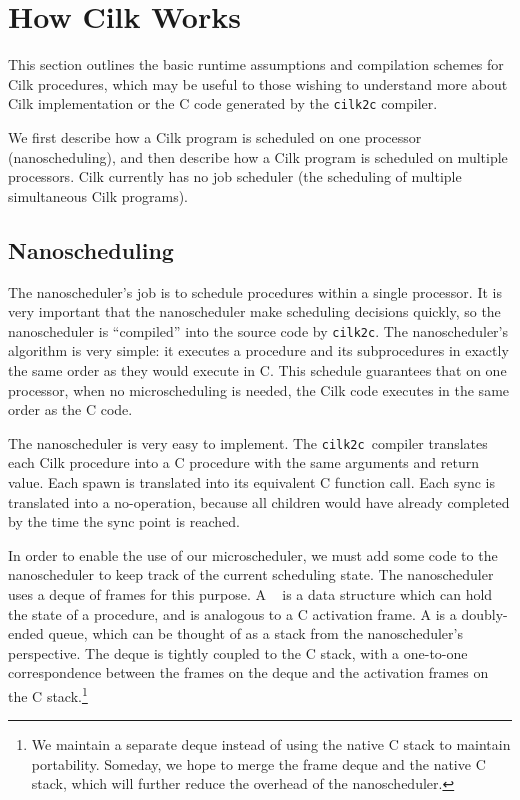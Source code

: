 \chapter{How Cilk Works}
\label{chap:impl-notes}

\newcommand{\cilktoc}{\texttt{cilk2c}}

This section outlines the basic runtime assumptions and compilation
schemes for Cilk procedures, which may be useful to those wishing to
understand more about Cilk implementation or the C code generated by
the \cilktoc{} compiler.

We first describe how a Cilk program is scheduled on one processor
(nanoscheduling), and then describe how a Cilk program is scheduled on
multiple processors.  Cilk currently has no job scheduler (the
scheduling of multiple simultaneous Cilk programs).

\section{Nanoscheduling}

The nanoscheduler's job is to schedule procedures within a single
processor.  It is very important that the nanoscheduler make
scheduling decisions quickly, so the nanoscheduler is ``compiled''
into the source code by \cilktoc.  The nanoscheduler's algorithm is
very simple: it executes a procedure and its subprocedures in exactly
the same order as they would execute in C\@.  This schedule guarantees
that on one processor, when no microscheduling is needed, the Cilk
code executes in the same order as the C code.

The nanoscheduler is very easy to implement.  The \cilktoc\ compiler
translates each Cilk procedure into a C procedure with the same
arguments and return value.  Each spawn is translated into its
equivalent C function call.  Each sync is translated into a
no-operation, because all children would have already completed by the
time the sync point is reached.

In order to enable the use of our microscheduler, we must add some
code to the nanoscheduler to keep track of the current scheduling
state.  The nanoscheduler uses a deque of frames for this purpose.  A
\sysname\
is a data structure which can hold the state of a procedure, and is
analogous to a C activation frame.  A
is a doubly-ended queue, which can be thought of as a stack from the
nanoscheduler's perspective.  The deque is tightly coupled to the C
stack, with a one-to-one correspondence between the frames on the
deque and the activation frames on the C stack.\footnote{We maintain a
separate deque instead of using the native C stack to maintain
portability.  Someday, we hope to merge the frame deque and the native
C stack, which will further reduce the overhead of the nanoscheduler.}

